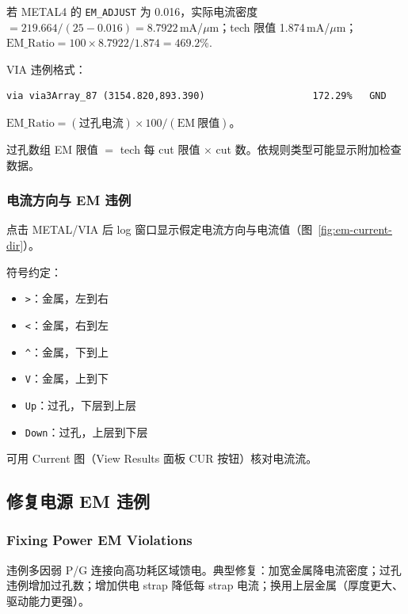 
若 METAL4 的 \texttt{EM\_ADJUST} 为 0.016，实际电流密度 $= 219.664 / (25 - 0.016) = 8.7922$\,mA/$\mu$m；tech 限值 1.874\,mA/$\mu$m；$\mathrm{EM\_Ratio} = 100 \times 8.7922 / 1.874 = 469.2$\%.

VIA 违例格式：
\begin{lstlisting}
via via3Array_87 (3154.820,893.390)                   172.29%   GND
\end{lstlisting}
$\mathrm{EM\_Ratio} = (\mathrm{过孔电流}) \times 100 / (\mathrm{EM\ 限值})$。


过孔数组 EM 限值 $=$ tech 每 cut 限值 $\times$ cut 数。依规则类型可能显示附加检查数据。

\subsubsection{电流方向与 EM 违例}
点击 METAL/VIA 后 log 窗口显示假定电流方向与电流值（图~\ref{fig:em-current-dir}）。


符号约定：
\begin{itemize}
  \item \texttt{>}：金属，左到右
  \item \texttt{<}：金属，右到左
  \item \texttt{\^{}}：金属，下到上
  \item \texttt{V}：金属，上到下
  \item \texttt{Up}：过孔，下层到上层
  \item \texttt{Down}：过孔，上层到下层
\end{itemize}

可用 Current 图（View Results 面板 CUR 按钮）核对电流流。

\subsection{修复电源 EM 违例}
\subsubsection*{Fixing Power EM Violations}

违例多因弱 P/G 连接向高功耗区域馈电。典型修复：加宽金属降电流密度；过孔违例增加过孔数；增加供电 strap 降低每 strap 电流；换用上层金属（厚度更大、驱动能力更强）。

